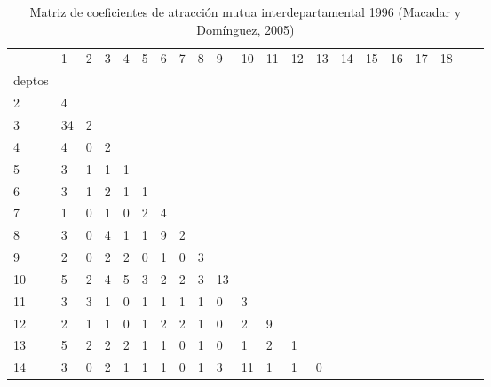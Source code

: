 \begin{table}
\centering
\caption{Matriz de coeficientes de atracción mutua interdepartamental 1996 (Macadar y Domínguez, 2005)}
\begin{tabular}{lp{0.7cm}p{0.7cm}p{0.7cm}p{0.7cm}p{0.7cm}p{0.7cm}p{0.7cm}p{0.7cm}p{0.7cm}p{0.7cm}p{0.7cm}p{0.7cm}p{0.7cm}p{0.7cm}p{0.7cm}p{0.7cm}p{0.7cm}p{0.7cm}p{0.7cm}p{0.7cm}}
\toprule
{} &   1 &  2 &  3 &  4 &  5 &  6 &  7 &  8 &  9 &  10 &  11 &  12 &  13 &  14 &  15 &  16 &  17 &  18 \\
deptos &     &    &    &    &    &    &    &    &    &     &     &     &     &     &     &     &     &     \\
\midrule
2      &   4 &    &    &    &    &    &    &    &    &     &     &     &     &     &     &     &     &     \\
3      &  34 &  2 &    &    &    &    &    &    &    &     &     &     &     &     &     &     &     &     \\
4      &   4 &  0 &  2 &    &    &    &    &    &    &     &     &     &     &     &     &     &     &     \\
5      &   3 &  1 &  1 &  1 &    &    &    &    &    &     &     &     &     &     &     &     &     &     \\
6      &   3 &  1 &  2 &  1 &  1 &    &    &    &    &     &     &     &     &     &     &     &     &     \\
7      &   1 &  0 &  1 &  0 &  2 &  4 &    &    &    &     &     &     &     &     &     &     &     &     \\
8      &   3 &  0 &  4 &  1 &  1 &  9 &  2 &    &    &     &     &     &     &     &     &     &     &     \\
9      &   2 &  0 &  2 &  2 &  0 &  1 &  0 &  3 &    &     &     &     &     &     &     &     &     &     \\
10     &   5 &  2 &  4 &  5 &  3 &  2 &  2 &  3 & 13 &     &     &     &     &     &     &     &     &     \\
11     &   3 &  3 &  1 &  0 &  1 &  1 &  1 &  1 &  0 &   3 &     &     &     &     &     &     &     &     \\
12     &   2 &  1 &  1 &  0 &  1 &  2 &  2 &  1 &  0 &   2 &   9 &     &     &     &     &     &     &     \\
13     &   5 &  2 &  2 &  2 &  1 &  1 &  0 &  1 &  0 &   1 &   2 &   1 &     &     &     &     &     &     \\
14     &   3 &  0 &  2 &  1 &  1 &  1 &  0 &  1 &  3 &  11 &   1 &   1 &   0 &     &     &     &     &     \\

\end{tabular}
\end{table}
